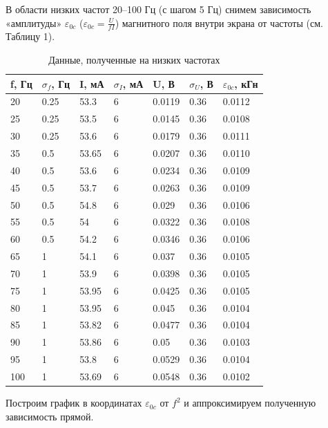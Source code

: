 \documentclass[a4paper,12pt]{report}
\begin{document}
В области низких частот 20–100 Гц (с шагом 5 Гц) снимем зависимость «амплитуды» $\varepsilon_{0c}$ (\(\varepsilon_{0c}=\frac{U}{fI}\)) магнитного поля внутри экрана от частоты (см. Таблицу 1).

\begin{table}[!ht]
    \centering
    \begin{tabular}{|p{1cm}|p{1.3cm}|p{1.3cm}|p{1.3cm}|p{1.3cm}|p{1cm}|p{1.7cm}|}
    \hline
        f, Гц & $\sigma_{f}$, Гц & I, мА & $\sigma_{I}$, мА & U, В & $\sigma_{U}$, В&$\varepsilon_{0c}$, кГн \\ \hline
        20 & 0.25 & 53.3 & 6 & 0.0119 & 0.36&0.0112 \\ \hline
        25 & 0.25 & 53.5 & 6 & 0.0145 & 0.36&0.0108 \\ \hline
        30 & 0.25 & 53.6 & 6 & 0.0179 & 0.36&0.0111 \\ \hline
        35 & 0.5 & 53.65 & 6 & 0.0207 & 0.36&0.0110 \\ \hline
        40 & 0.5 & 53.6 & 6 & 0.0234 & 0.36&0.0109 \\ \hline
        45 & 0.5 & 53.7 & 6 & 0.0263 & 0.36&0.0109 \\ \hline
        50 & 0.5 & 54.8 & 6 & 0.029 & 0.36&0.0106 \\ \hline
        55 & 0.5 & 54 & 6 & 0.0322 & 0.36&0.0108 \\ \hline
        60 & 0.5 & 54.2 & 6 & 0.0346 & 0.36&0.0106 \\ \hline
        65 & 1 & 54.1 & 6 & 0.037 & 0.36&0.0105 \\ \hline
        70 & 1 & 53.9 & 6 & 0.0398 & 0.36&0.0105 \\ \hline
        75 & 1 & 53.95 & 6 & 0.0425 & 0.36&0.0105 \\ \hline
        80 & 1 & 53.95 & 6 & 0.045 & 0.36&0.0104 \\ \hline
        85 & 1 & 53.82 & 6 & 0.0477 & 0.36&0.0104 \\ \hline
        90 & 1 & 53.86 & 6 & 0.05 & 0.36&0.0103 \\ \hline
        95 & 1 & 53.8 & 6 & 0.0529 & 0.36&0.0104 \\ \hline
        100 & 1 & 53.69 & 6 & 0.0548 & 0.36&0.0102 \\ \hline
    \end{tabular}
\begin{center}
\caption{Данные, полученные на низких частотах}
\end{center}
\end{table}
Построим график в координатах $\varepsilon_{0c}$ от $f^2$ и аппроксимируем полученную зависимость прямой.
\end{document}
